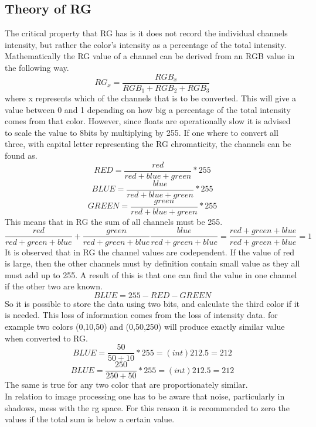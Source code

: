 \subsection{Theory of RG} 
The critical property that RG has is it does not record the individual channels intensity, but rather the color's intensity as a percentage of the total intensity. Mathematically the RG value of a channel can be derived from an RGB value in the following way.
\[ RG_x = \frac{RGB_x}{RGB_1 + RGB_2 + RGB_3}\]
where x represents which of the channels that is to be converted. This will give a value between 0 and 1 depending on how big a percentage of the total intensity comes from that color. However, since floats are operationally slow it is advised to scale the value to 8bits by multiplying by 255. If one where to convert all three, with capital letter representing the RG chromaticity, the channels can be found as.
\[ RED = \frac{red}{red + blue + green} * 255\]
\[ BLUE = \frac{blue}{red + blue + green} * 255\]
\[ GREEN = \frac{green}{red + blue + green} * 255\]
This means that in RG the sum of all channels must be 255.
\[ \frac{red}{red + green + blue} + \frac{green}{red + green + blue} \frac{blue}{red + green + blue} =  \frac{red + green + blue}{red + green + blue} = 1\]
It is observed that in RG the channel values are codependent. If the value of red is large, then the other channels must by definition contain small value as they all must add up to 255. A result of this is that one can find the value in one channel if the other two are known.
\[ BLUE = 255 - RED - GREEN\]
So it is possible to store the data using two bits, and calculate the third color if it is needed. This loss of information comes from the loss of intensity data\cite{NormRGB}. for example two colors (0,10,50) and (0,50,250) will produce exactly similar value when converted to RG. 
\[ BLUE = \frac{50}{50 + 10} * 255 = (int)212.5 = 212 \]
\[ BLUE = \frac{250}{250 + 50} * 255 = (int)212.5 = 212 \]
The same is true for any two color that are proportionately similar.\\
In relation to image processing one has to be aware that noise, particularly in shadows, mess with the rg space. For this reason it is recommended to zero the values if the total sum is below a certain value.

